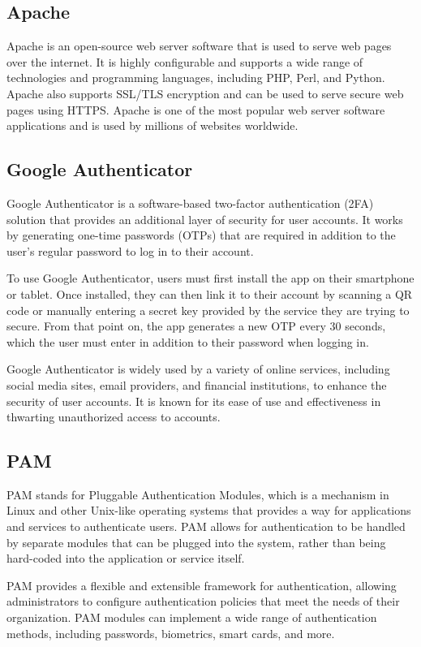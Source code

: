 \documentclass[12pt]{article}
\begin{document}
\subsection{Apache}
Apache is an open-source web server software that is used to serve web pages over the internet. It is highly configurable and supports a wide range of technologies and programming languages, including PHP, Perl, and Python. Apache also supports SSL/TLS encryption and can be used to serve secure web pages using HTTPS. Apache is one of the most popular web server software applications and is used by millions of websites worldwide.

\newpage

\subsection{Google Authenticator}
Google Authenticator is a software-based two-factor authentication (2FA) solution that provides an additional layer of security for user accounts. It works by generating one-time passwords (OTPs) that are required in addition to the user's regular password to log in to their account.

To use Google Authenticator, users must first install the app on their smartphone or tablet. Once installed, they can then link it to their account by scanning a QR code or manually entering a secret key provided by the service they are trying to secure. From that point on, the app generates a new OTP every 30 seconds, which the user must enter in addition to their password when logging in.

Google Authenticator is widely used by a variety of online services, including social media sites, email providers, and financial institutions, to enhance the security of user accounts. It is known for its ease of use and effectiveness in thwarting unauthorized access to accounts.

\subsection{PAM}
PAM stands for Pluggable Authentication Modules, which is a mechanism in Linux and other Unix-like operating systems that provides a way for applications and services to authenticate users. PAM allows for authentication to be handled by separate modules that can be plugged into the system, rather than being hard-coded into the application or service itself.

PAM provides a flexible and extensible framework for authentication, allowing administrators to configure authentication policies that meet the needs of their organization. PAM modules can implement a wide range of authentication methods, including passwords, biometrics, smart cards, and more.
\end{document}
